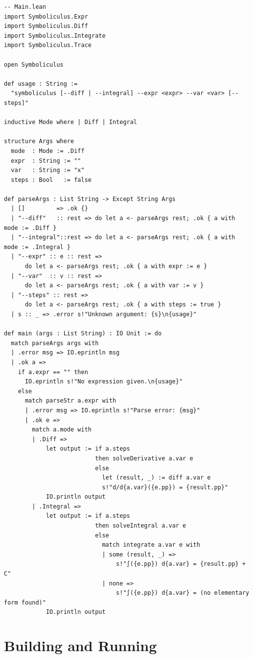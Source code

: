 \documentclass[12pt, openany]{book}
\theoremstyle{plain}
\theoremstyle{definition}
\theoremstyle{remark}
\begin{document}
\begin{leanbox}
\begin{lstlisting}
-- Main.lean
import Symboliculus.Expr
import Symboliculus.Diff
import Symboliculus.Integrate
import Symboliculus.Trace

open Symboliculus

def usage : String :=
  "symboliculus [--diff | --integral] --expr <expr> --var <var> [--steps]"

inductive Mode where | Diff | Integral

structure Args where
  mode  : Mode := .Diff
  expr  : String := ""
  var   : String := "x"
  steps : Bool   := false

def parseArgs : List String -> Except String Args
  | []         => .ok {}
  | "--diff"   :: rest => do let a <- parseArgs rest; .ok { a with mode := .Diff }
  | "--integral"::rest => do let a <- parseArgs rest; .ok { a with mode := .Integral }
  | "--expr" :: e :: rest =>
      do let a <- parseArgs rest; .ok { a with expr := e }
  | "--var"  :: v :: rest =>
      do let a <- parseArgs rest; .ok { a with var := v }
  | "--steps" :: rest =>
      do let a <- parseArgs rest; .ok { a with steps := true }
  | s :: _ => .error s!"Unknown argument: {s}\n{usage}"

def main (args : List String) : IO Unit := do
  match parseArgs args with
  | .error msg => IO.eprintln msg
  | .ok a =>
    if a.expr == "" then
      IO.eprintln s!"No expression given.\n{usage}"
    else
      match parseStr a.expr with
      | .error msg => IO.eprintln s!"Parse error: {msg}"
      | .ok e =>
        match a.mode with
        | .Diff =>
            let output := if a.steps
                          then solveDerivative a.var e
                          else
                            let (result, _) := diff a.var e
                            s!"d/d{a.var}({e.pp}) = {result.pp}"
            IO.println output
        | .Integral =>
            let output := if a.steps
                          then solveIntegral a.var e
                          else
                            match integrate a.var e with
                            | some (result, _) =>
                                s!"∫({e.pp}) d{a.var} = {result.pp} + C"
                            | none =>
                                s!"∫({e.pp}) d{a.var} = (no elementary form found)"
            IO.println output
\end{lstlisting}
\end{leanbox}
\color{black}

\section{Building and Running}
\end{document}

